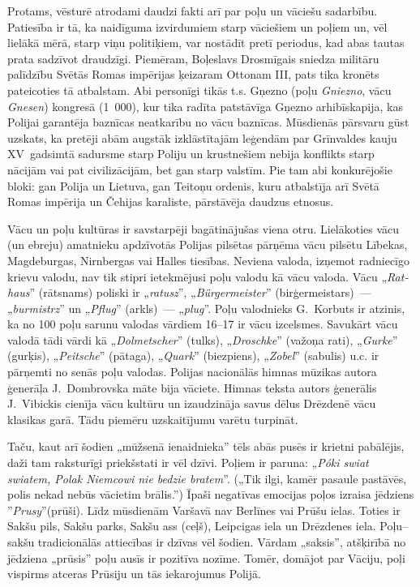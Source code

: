\documentclass[twoside,a5paper,12pt,fleqn,openany]{extbook}
\newcommand{\pltxti}[1]{\textit{\textpolish{#1}}}
\newcommand{\detxti}[1]{\textit{\textgerman{#1}}}
\begin{document}
Protams, vēsturē atrodami daudzi fakti arī par poļu un vāciešu sadarbību. Patiesība ir tā, ka naidīguma izvirdumiem starp vāciešiem un poļiem un, vēl lielākā mērā, starp viņu politiķiem, var nostādīt pretī periodus, kad abas tautas prata sadzīvot draudzīgi. Piemēram, Boļeslavs Drosmīgais sniedza militāru palīdzību Svētās Romas impērijas ķeizaram Ottonam III, pats tika kronēts pateicoties tā atbalstam. Abi personīgi tikās t.s. Gņezno (poļu \pltxti{Gniezno}, vācu \detxti{Gnesen}) kongresā (1~000), kur tika radīta patstāvīga Gņezno arhibīskapija, kas Polijai garantēja baznīcas neatkarību no vācu baznīcas. Mūsdienās pārsvaru gūst uzskats, ka pretēji abām augstāk izklāstītajām leģendām par Grīnvaldes kauju XV~gadsimtā sadursme starp Poliju un krustnešiem nebija konflikts starp nācijām vai pat civilizācijām, bet gan starp valstīm. Pie tam abi konkurējošie bloki: gan Polija un Lietuva, gan Teitoņu ordenis, kuru atbalstīja arī Svētā Romas impērija un Čehijas karaliste, pārstāvēja daudzus etnosus.

Vācu un poļu kultūras ir savstarpēji bagātinājušas viena otru. Lielākoties vācu (un ebreju) amatnieku apdzīvotās Polijas pilsētas pārņēma vācu pilsētu Lībekas, Magdeburgas, Nirnbergas vai Halles tiesības. Neviena valoda, izņemot radniecīgo krievu valodu, nav tik stipri ietekmējusi poļu valodu kā vācu valoda. Vācu „\detxti{Rathaus}'' (rātsnams) poliski ir „\pltxti{ratusz}”, „\detxti{Bürgermeister}” (birģermeistars)~--- „\pltxti{burmistrz}” un „\detxti{Pflug}” (arkls)~--- „\pltxti{plug}”. Poļu valodnieks G.~Korbuts ir atzinis, ka no 100 poļu sarunu valodas vārdiem 16--17 ir vācu izcelsmes. Savukārt vācu valodā tādi vārdi kā „\detxti{Dolmetscher}” (tulks), „\detxti{Droschke}” (važoņa rati), „\detxti{Gurke}” (gurķis), „\detxti{Peitsche}” (pātaga), „\detxti{Quark}” (biezpiens), „\detxti{Zobel}” (sabulis) u.c. ir pārņemti no senās poļu valodas. Polijas nacionālās himnas mūzikas autora ģenerāļa J.~Dombrovska māte bija vāciete. Himnas teksta autors ģenerālis J.~Vibickis cienīja vācu kultūru un izaudzināja savus dēlus Drēzdenē vācu klasikas garā. Tādu piemēru uzskaitījumu varētu turpināt.

Taču, kaut arī šodien „mūžsenā ienaidnieka” tēls abās pusēs ir krietni pabālējis, daži tam raksturīgi priekšstati ir vēl dzīvi. Poļiem ir paruna: „\pltxti{Póki swiat swiatem, Polak Niemcowi nie bedzie bratem}”. („Tik ilgi, kamēr pasaule pastāvēs, polis nekad nebūs vācietim brālis.'') Īpaši negatīvas emocijas poļos izraisa jēdziens ''\pltxti{Prusy}''(prūši). Līdz mūsdienām Varšavā nav Berlīnes vai Prūšu ielas. Toties ir Sakšu pils, Sakšu parks, Sakšu ass (ceļš), Leipcigas iela un Drēzdenes iela. Poļu--sakšu tradicionālās attiecības ir dzīvas vēl šodien. Vārdam „saksis”, atšķirībā no jēdziena „prūsis” poļu ausīs ir pozitīva nozīme. Tomēr, domājot par Vāciju, poļi vispirms atceras Prūsiju un tās iekarojumus Polijā.
\end{document}
